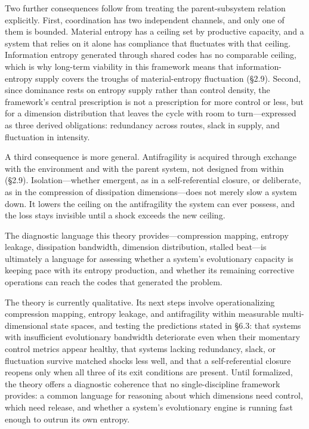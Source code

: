 \documentclass[11pt,a4paper]{article}
\begin{document}
Two further consequences follow from treating the parent-subsystem relation explicitly. First, coordination has two independent channels, and only one of them is bounded. Material entropy has a ceiling set by productive capacity, and a system that relies on it alone has compliance that fluctuates with that ceiling. Information entropy generated through shared codes has no comparable ceiling, which is why long-term viability in this framework means that information-entropy supply covers the troughs of material-entropy fluctuation (\S2.9). Second, since dominance rests on entropy supply rather than control density, the framework's central prescription is not a prescription for more control or less, but for a dimension distribution that leaves the cycle with room to turn---expressed as three derived obligations: redundancy across routes, slack in supply, and fluctuation in intensity.

A third consequence is more general. Antifragility is acquired through exchange with the environment and with the parent system, not designed from within (\S2.9). Isolation---whether emergent, as in a self-referential closure, or deliberate, as in the compression of dissipation dimensions---does not merely slow a system down. It lowers the ceiling on the antifragility the system can ever possess, and the loss stays invisible until a shock exceeds the new ceiling.

The diagnostic language this theory provides---compression mapping, entropy leakage, dissipation bandwidth, dimension distribution, stalled beat---is ultimately a language for assessing whether a system's evolutionary capacity is keeping pace with its entropy production, and whether its remaining corrective operations can reach the codes that generated the problem.

The theory is currently qualitative. Its next steps involve operationalizing compression mapping, entropy leakage, and antifragility within measurable multi-dimensional state spaces, and testing the predictions stated in \S6.3: that systems with insufficient evolutionary bandwidth deteriorate even when their momentary control metrics appear healthy, that systems lacking redundancy, slack, or fluctuation survive matched shocks less well, and that a self-referential closure reopens only when all three of its exit conditions are present. Until formalized, the theory offers a diagnostic coherence that no single-discipline framework provides: a common language for reasoning about which dimensions need control, which need release, and whether a system's evolutionary engine is running fast enough to outrun its own entropy.
\end{document}
